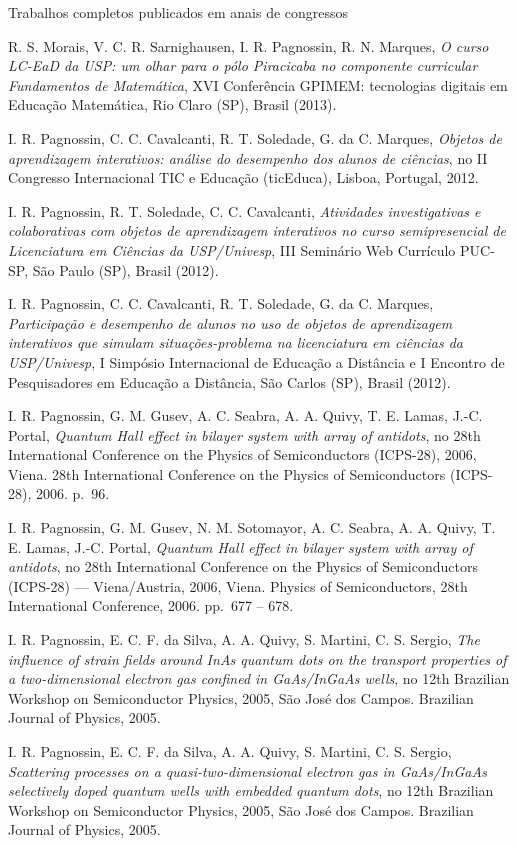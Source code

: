 \begin{compactitem}
  \item Trabalhos completos publicados em anais de congressos
  \begin{compactitem}
    \item R. S. Morais, V. C. R. Sarnighausen, I. R. Pagnossin, R. N. Marques, \textsl{O curso LC-EaD da USP: um olhar para o pólo Piracicaba no componente curricular Fundamentos de Matemática}, XVI Conferência GPIMEM: tecnologias digitais em Educação Matemática, Rio Claro (SP), Brasil (2013).
    \item I. R. Pagnossin, C. C. Cavalcanti, R. T. Soledade, G. da C. Marques, \textsl{Objetos de aprendizagem interativos: análise do desempenho dos alunos de ciências}, no II Congresso Internacional TIC e Educação (ticEduca), Lisboa, Portugal, 2012.
    \item I. R. Pagnossin, R. T. Soledade, C. C. Cavalcanti, \textsl{Atividades investigativas e colaborativas com objetos de aprendizagem interativos no curso semipresencial de Licenciatura em Ciências da USP/Univesp}, III Seminário Web Currículo PUC-SP, São Paulo (SP), Brasil (2012).
    \item I. R. Pagnossin, C. C. Cavalcanti, R. T. Soledade, G. da C. Marques, \textsl{Participação e desempenho de alunos no uso de objetos de aprendizagem interativos que simulam situações-problema na licenciatura em ciências da USP/Univesp}, I Simpósio Internacional de Educação a Distância e I Encontro de Pesquisadores em Educação a Distância, São Carlos (SP), Brasil (2012).    
    \item I. R. Pagnossin, G. M. Gusev, A. C. Seabra, A. A. Quivy, T. E. Lamas, J.-C. Portal, \textsl{Quantum Hall effect in bilayer system with array of antidots}, no 28th International Conference on the Physics of Semiconductors (ICPS-28), 2006, Viena. 28th International Conference on the Physics of Semiconductors (ICPS-28), 2006. p.~96.
    \item I. R. Pagnossin, G. M. Gusev, N. M. Sotomayor, A. C. Seabra, A. A. Quivy, T. E. Lamas, J.-C. Portal, \textsl{Quantum Hall effect in bilayer system with array of antidots}, no 28th International Conference on the Physics of Semiconductors (ICPS-28) --- Viena/Austria, 2006, Viena. Physics of Semiconductors, 28th International Conference, 2006. pp.~677 -- 678.
    \item I. R. Pagnossin, E. C. F. da Silva, A. A. Quivy, S. Martini, C. S. Sergio, \textsl{The influence of strain fields around InAs quantum dots on the transport properties of a two-dimensional electron gas confined in GaAs/InGaAs wells}, no 12th Brazilian Workshop on Semiconductor Physics, 2005, São José dos Campos. Brazilian Journal of Physics, 2005.
    \item I. R. Pagnossin, E. C. F. da Silva, A. A. Quivy, S. Martini, C. S. Sergio, \textsl{Scattering processes on a quasi-two-dimensional electron gas in GaAs/InGaAs selectively doped quantum wells with embedded quantum dots}, no 12th Brazilian Workshop on Semiconductor Physics, 2005, São José dos Campos. Brazilian Journal of Physics, 2005.
  \end{compactitem}
	

\end{compactitem}
